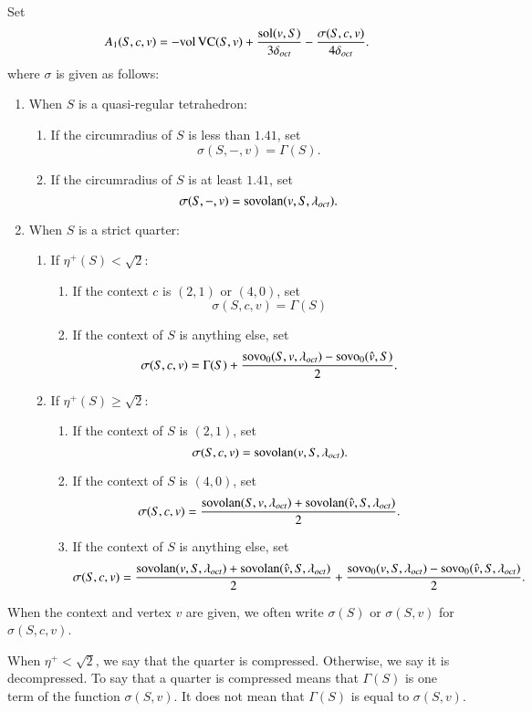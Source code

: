 \begin{definition}\label{def:sigma}
Set
   \begin{equation}\label{eqn:a1-sigma}
   A_1(S,c,v) = -{\operatorname{vol}}\,{\operatorname{VC}}(S,v)+
      \frac{\operatorname{sol}(v,S)}{3\delta_{oct}} - \frac{\sigma(S,c,v)}{4\delta_{oct}}.
      \end{equation}  where $\sigma$ is given as follows:
\begin{enumerate}
\item When $S$ is a quasi-regular tetrahedron:
   \begin{enumerate}
      \item If the circumradius of $S$ is less than $1.41$, set
         $$\sigma(S,-,v)=\Gamma(S).$$
      \item If the circumradius of $S$ is at least $1.41$, set
         $$\sigma(S,-,v)={\operatorname{sovolan}}(v,S,\lambda_{oct}).$$
   \end{enumerate}
\item When $S$ is a strict quarter:
   \begin{enumerate}
      \item If $\eta^+(S) <\sqrt2$:
         \begin{enumerate}
         \item If the context $c$ is $(2,1)$ or $(4,0)$, set
                  $$\sigma(S,c,v)=\Gamma(S)$$
         \item If the context of $S$ is anything else, set
                  $$\sigma(S,c,v)=\Gamma(S) +
                     \frac{{\operatorname{sovo}}_0(S,v,\lambda_{oct})
                      -{\operatorname{sovo}}_0(\hat v,S)}{2}.$$
         \end{enumerate}
      \item If $\eta^+(S) \ge\sqrt2$:
         \begin{enumerate}
         \item If the context of $S$ is $(2,1)$, set
                  $$\sigma(S,c,v)={\operatorname{sovolan}}(v,S,\lambda_{oct}).$$
         \item If the context of $S$ is $(4,0)$, set
                  $$\sigma(S,c,v)=\frac{{\operatorname{sovolan}}(S,v,\lambda_{oct})
            +{\operatorname{sovolan}}(\hat v,S,\lambda_{oct})}{2}.$$
         \item If the context of $S$ is anything else, set
                  $$\sigma(S,c,v)=\frac{{\operatorname{sovolan}}(v,S,\lambda_{oct})
           +{\operatorname{sovolan}}(\hat v,S,\lambda_{oct})
                  }{2}
                     +\frac{{\operatorname{sovo}}_0(v,S,\lambda_{oct})-
                     {\operatorname{sovo}}_0(\hat v,S,\lambda_{oct})}{2}.$$
         \end{enumerate}
   \end{enumerate}
\end{enumerate}
When the context and vertex $v$ are given, we often write
$\sigma(S)$ or $\sigma(S,v)$ for $\sigma(S,c,v)$.

When $\eta^+<\sqrt2$, we say that the quarter is compressed.
Otherwise, we say it is decompressed.  To say that a quarter is
compressed means that $\Gamma(S)$ is one term of the function
$\sigma(S,v)$. It does not mean that $\Gamma(S)$ is equal to
$\sigma(S,v)$.
%
\end{definition}

